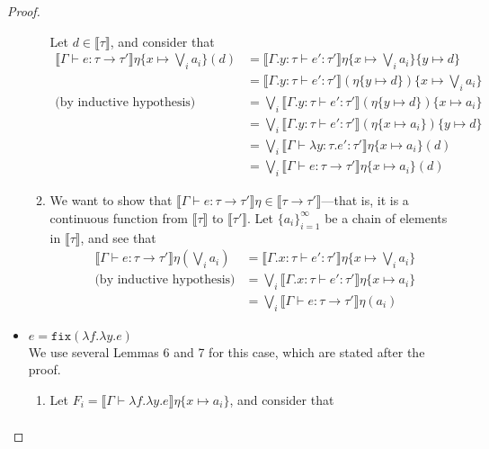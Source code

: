 \begin{proof}
\begin{itemize}
\begin{enumerate}
Let $d \in \llbracket \tau \rrbracket$, and consider that
\begin{align*}
\llbracket \Gamma \vdash e : \tau \rightarrow \tau' \rrbracket\eta\{x\mapsto  \bigvee_i a_i\}(d) 
&= \llbracket \Gamma.y : \tau \vdash e' : \tau'\rrbracket\eta\{x\mapsto  \bigvee_i a_i\}
\{y \mapsto d\} \\
&= \llbracket \Gamma.y : \tau \vdash e' : \tau'\rrbracket(\eta\{y \mapsto d\})\{x\mapsto  \bigvee_i a_i\} \\
\text{(by inductive hypothesis)}&=\bigvee_i\llbracket \Gamma.y:\tau\vdash e':\tau'\rrbracket(\eta\{y\mapsto d\})
\{x\mapsto a_i\} \\
&=\bigvee_i\llbracket \Gamma.y:\tau\vdash e':\tau'\rrbracket(\eta\{x\mapsto a_i\})\{y\mapsto d\} \\
&= \bigvee_i \llbracket \Gamma \vdash \lambda y : \tau.e' : \tau' \rrbracket \eta\{x\mapsto a_i\}(d) \\
&= \bigvee_i \llbracket \Gamma \vdash e : \tau \rightarrow \tau' \rrbracket \eta\{x\mapsto a_i\}(d) 
\end{align*}
%
 \item We want to show that $\llbracket \Gamma \vdash e : \tau \rightarrow \tau' \rrbracket\eta \in \llbracket \tau \rightarrow 
 \tau'\rrbracket$---that is, it is a continuous function from $\llbracket \tau \rrbracket$ to $\llbracket \tau' \rrbracket$. Let 
 $\{a_i\}^{\infty}_{i=1}$ be a chain of elements in $\llbracket \tau \rrbracket$, and see that
 \begin{align*}
 \llbracket \Gamma \vdash e : \tau \rightarrow \tau' \rrbracket\eta(\bigvee_i a_i) &= \llbracket \Gamma.x : \tau 
 \vdash e' : \tau'\rrbracket\eta \{x \mapsto \bigvee_i a_i\} \\
 \text{(by inductive hypothesis)} &= \bigvee_i \llbracket \Gamma.x : \tau \vdash e' : \tau'\rrbracket\eta\{x\mapsto a_i\}\\
 &= \bigvee_i \llbracket \Gamma \vdash e : \tau \rightarrow \tau' \rrbracket\eta(a_i) 
 \end{align*}
 \end{enumerate} 
 \item $e = \texttt{fix} (\lambda f.\lambda y.e)$ \\
  We use several Lemmas 6 and 7 for this case, which are stated after the proof.
 \begin{enumerate}
\item Let $F_i = \llbracket \Gamma \vdash \lambda f. \lambda y.e\rrbracket\eta\{x\mapsto a_i\}$, and consider that 
 \begin{align*}

\end{align*}
\end{enumerate}
\end{itemize}
\end{proof}
